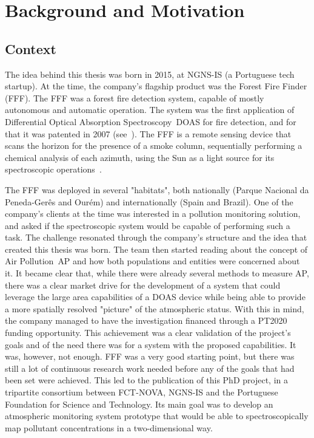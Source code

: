 \newcommand{\novathesis}{\emph{novathesis}}
\newcommand{\novathesisclass}{\texttt{novathesis.cls}}



\chapter{Background and Motivation}%
\label{cha:bg_and_motivation}

\section{Context}%
\label{sec:context}

The idea behind this thesis was born in 2015, at NGNS-IS (a Portuguese
tech startup). At the time, the company's flagship product was the
Forest Fire Finder (\gls{FFF}). The \gls{FFF} was a forest fire
detection system, capable of mostly autonomous and automatic operation.
The system was the first application of Differential Optical Absorption
Spectroscopy~\gls{DOAS} for fire detection, and for that it was patented
in 2007 (see~\cite{Vieira2007, Application2008}). The \gls{FFF} is a
remote sensing device that scans the horizon for the presence of a smoke
column, sequentially performing a chemical analysis of each azimuth,
using the Sun as a light source for its spectroscopic
operations~\cite{ValentedeAlmeida2017}.

The \gls{FFF} was deployed in several "habitats", both nationally
(Parque Nacional da Peneda-Gerês and Ourém) and internationally (Spain
and Brazil). One of the company's clients at the time was interested in
a pollution monitoring solution, and asked if the spectroscopic system
would be capable of performing such a task. The challenge resonated
through the company's structure and the idea that created this thesis
was born. The team then started reading about the concept of Air
Pollution~\gls{AP} and how both populations and entities were concerned
about it. It became clear that, while there were already several methods
to measure \gls{AP}, there was a clear market drive for the development
of a system that could leverage the large area capabilities of a
\gls{DOAS} device while being able to provide a more spatially resolved
"picture" of the atmospheric status. With this in mind, the company
managed to have the investigation financed through a PT2020 funding
opportunity. This achievement was a clear validation of the project's
goals and of the need there was for a system with the proposed
capabilities. It was, however, not enough. \gls{FFF} was a very good
starting point, but there was still a lot of continuous research work
needed before any of the goals that had been set were achieved. This led
to the publication of this PhD project, in a tripartite consortium
between FCT-NOVA, NGNS-IS and the Portuguese Foundation for Science and
Technology. Its main goal was to develop an atmospheric monitoring
system prototype that would be able to spectroscopically map pollutant
concentrations in a two-dimensional way.

